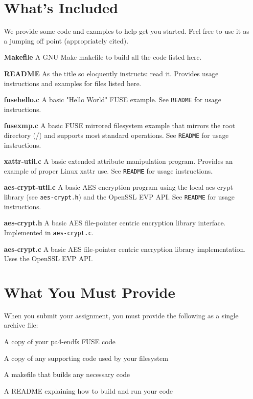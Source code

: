 \documentclass[12pt]{article}
\newenvironment{packed_enum}{
\begin{enumerate}
  \setlength{\itemsep}{1pt}
  \setlength{\parskip}{0pt}
  \setlength{\parsep}{0pt}
}{\end{enumerate}}
\newenvironment{packed_item}{
\begin{itemize}
  \setlength{\itemsep}{1pt}
  \setlength{\parskip}{0pt}
  \setlength{\parsep}{0pt}
}{\end{itemize}}
\begin{document}
\section{What's Included}

We provide some code and examples to help get you started.
Feel free to use it as a jumping off point (appropriately cited).

\begin{packed_item}
\item {\bf Makefile} A GNU Make makefile to build all the code listed
  here.
\item {\bf README} As the title so eloquently instructs: read
  it. Provides usage instructions and examples for files listed here.
\item {\bf fusehello.c} A basic "Hello World" FUSE example. See
  \texttt{README} for usage instructions.
\item {\bf fusexmp.c} A basic FUSE mirrored filesystem example that
  mirrors the root directory (/) and supports most standard
  operations. See \texttt{README} for usage instructions.
\item {\bf xattr-util.c} A basic extended attribute manipulation
  program. Provides an example of proper Linux xattr use.
  See \texttt{README} for usage instructions.
\item {\bf aes-crypt-util.c} A basic AES encryption program using the
  local aes-crypt library (see \texttt{aes-crypt.h}) and the OpenSSL EVP
  API\cite{openssl-evp}. See \texttt{README} for usage instructions.
\item {\bf aes-crypt.h} A basic AES file-pointer centric encryption
  library interface. Implemented in \texttt{aes-crypt.c}.
\item {\bf aes-crypt.c} A basic AES file-pointer centric encryption
  library implementation. Uses the OpenSSL EVP API\cite{openssl-evp}.
\end{packed_item}

\section{What You Must Provide}

When you submit your assignment, you must provide the following as a
single archive file:
\begin{packed_enum}
\item A copy of your pa4-endfs FUSE code
\item A copy of any supporting code used by your filesystem
\item A makefile that builds any necessary code
\item A README explaining how to build and run your code
\end{packed_enum}
\end{document}
